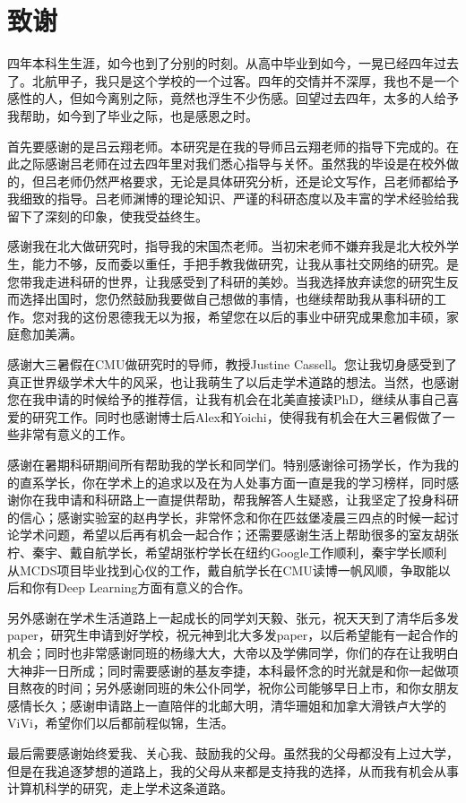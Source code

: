 \chapter*{致谢}

\qquad 四年本科生生涯，如今也到了分别的时刻。从高中毕业到如今，一晃已经四年过去了。北航甲子，我只是这个学校的一个过客。四年的交情并不深厚，我也不是一个感性的人，但如今离别之际，竟然也浮生不少伤感。回望过去四年，太多的人给予我帮助，如今到了毕业之际，也是感恩之时。

首先要感谢的是吕云翔老师。本研究是在我的导师吕云翔老师的指导下完成的。在此之际感谢吕老师在过去四年里对我们悉心指导与关怀。虽然我的毕设是在校外做的，但吕老师仍然严格要求，无论是具体研究分析，还是论文写作，吕老师都给予我细致的指导。吕老师渊博的理论知识、严谨的科研态度以及丰富的学术经验给我留下了深刻的印象，使我受益终生。

感谢我在北大做研究时，指导我的宋国杰老师。当初宋老师不嫌弃我是北大校外学生，能力不够，反而委以重任，手把手教我做研究，让我从事社交网络的研究。是您带我走进科研的世界，让我感受到了科研的美妙。当我选择放弃读您的研究生反而选择出国时，您仍然鼓励我要做自己想做的事情，也继续帮助我从事科研的工作。您对我的这份恩德我无以为报，希望您在以后的事业中研究成果愈加丰硕，家庭愈加美满。

感谢大三暑假在CMU做研究时的导师，教授Justine Cassell。您让我切身感受到了真正世界级学术大牛的风采，也让我萌生了以后走学术道路的想法。当然，也感谢您在我申请的时候给予的推荐信，让我有机会在北美直接读PhD，继续从事自己喜爱的研究工作。同时也感谢博士后Alex和Yoichi，使得我有机会在大三暑假做了一些非常有意义的工作。

感谢在暑期科研期间所有帮助我的学长和同学们。特别感谢徐可扬学长，作为我的的直系学长，你在学术上的追求以及在为人处事方面一直是我的学习榜样，同时感谢你在我申请和科研路上一直提供帮助，帮我解答人生疑惑，让我坚定了投身科研的信心；感谢实验室的赵冉学长，非常怀念和你在匹兹堡凌晨三四点的时候一起讨论学术问题，希望以后再有机会一起合作；还需要感谢生活上帮助很多的室友胡张柠、秦宇、戴自航学长，希望胡张柠学长在纽约Google工作顺利，秦宇学长顺利从MCDS项目毕业找到心仪的工作，戴自航学长在CMU读博一帆风顺，争取能以后和你有Deep Learning方面有意义的合作。


另外感谢在学术生活道路上一起成长的同学刘天毅、张元，祝天天到了清华后多发paper，研究生申请到好学校，祝元神到北大多发paper，以后希望能有一起合作的机会；同时也非常感谢同班的杨缘大大，大帝以及学佛同学，你们的存在让我明白大神非一日所成；同时需要感谢的基友李捷，本科最怀念的时光就是和你一起做项目熬夜的时间；另外感谢同班的朱公仆同学，祝你公司能够早日上市，和你女朋友感情长久；感谢申请路上一直陪伴的北邮大明，清华珊姐和加拿大滑铁卢大学的ViVi，希望你们以后都前程似锦，生活。


最后需要感谢始终爱我、关心我、鼓励我的父母。虽然我的父母都没有上过大学，但是在我追逐梦想的道路上，我的父母从来都是支持我的选择，从而我有机会从事计算机科学的研究，走上学术这条道路。


















\cleardoublepage
